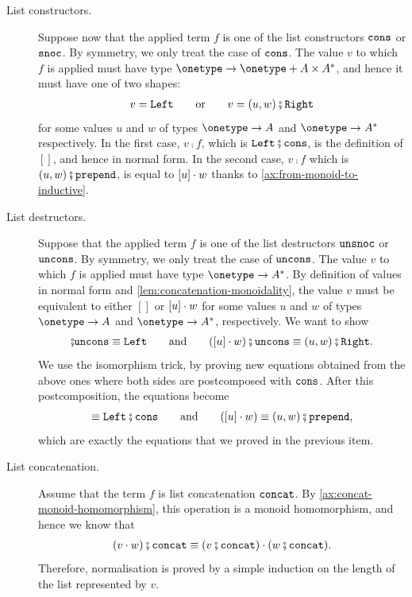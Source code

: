 \begin{description}
    \item[List constructors.] Suppose now that the applied term $f$ is one of  the list constructors $\mathtt{cons}$ or $\mathtt{snoc}$. By symmetry, we only treat the case of $\mathtt{cons}$.  The value $v$ to which $f$ is applied must have type $\onetype  \to \onetype  + A \times A^*$, and hence it  must have one of two shapes:
    \begin{align*}
        v = \leftterm \qquad \text{or} \qquad  v = (u,w)\comp \rightterm
    \end{align*}
    for some values $u$ and $w$ of types $\onetype \to A$ and $\onetype \to A^*$ respectively. In the first case, $v\comp{}f$, which is $\leftterm\comp \consterm$, is the definition of $[]$, and hence in  normal form. In the second case,   $v\comp{}f$ which is $(u,w)\comp \prependterm$, is equal to $[u] \cdot w$ thanks to \cref{ax:from-monoid-to-inductive}.
    \item[List destructors.] Suppose that the applied term $f$ is one of the list destructors $\mathtt{unsnoc}$ or $\mathtt{uncons}$. By symmetry, we only treat the case of $\mathtt{uncons}$. The value $v$ to which $f$ is applied must have type $\onetype \to A^*$. By definition of values in normal form and \cref{lem:concatenation-monoidality}, the value $v$  must be equivalent to  either $[]$ or $[u] \cdot w$ for some values $u$ and $w$ of types $\onetype \to A$ and $\onetype \to A^*$, respectively. We want to show 
    \begin{align*}
    []\comp \unconsterm \equiv \leftterm  \qquad \text{and} \qquad ([u] \wdot w)\comp\unconsterm \equiv (u,w)\comp \rightterm.
    \end{align*}
    We use the isomorphism trick, by proving new equations obtained from the above ones where both sides are postcomposed with $\mathtt{cons}$. After this postcomposition, the equations become
    \begin{align*}
    [] \equiv \leftterm\comp \consterm \qquad \text{and} \qquad ([u] \wdot w) \equiv (u,w)\comp \prependterm,
    \end{align*}
    which are exactly the equations that we proved in the previous item. 
    \item[List concatenation.] Assume that the term $f$ is list concatenation $\mathtt{concat}$. By  \cref{ax:concat-monoid-homomorphism}, this operation is a monoid homomorphism, and hence we know that 
     \begin{align*}
        (v \wdot w)\comp \concatterm \equiv (v\comp \concatterm) \wdot (w\comp \concatterm).
    \end{align*}
    Therefore, normalisation is proved by a simple induction on  the length of the list represented by $v$. 


\end{description}
